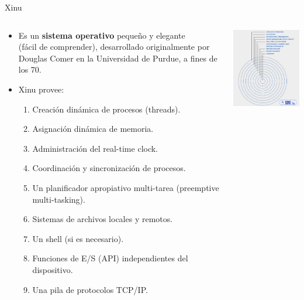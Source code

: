 \documentclass[8pt,aspectratio=169,compress]{beamer}
\begin{document}
\begin{frame}{Xinu}

    \begin{columns}[onlytextwidth,T]
      \column{\dimexpr\linewidth-70mm-5mm}

\begin{small}
	\begin{itemize}
\item[Xinu] Es un \textbf{sistema operativo} pequeño y elegante \\ (fácil de comprender), desarrollado originalmente por Douglas Comer en la Universidad de Purdue, a fines de los 70. 
\bigskip
  \item[Características] Xinu provee:
\begin{enumerate}
\item Creación dinámica de procesos (threads).
\item Asignación dinámica de memoria.
\item Administración del real-time clock.
\item Coordinación y sincronización de procesos.
\item Un planificador apropiativo multi-tarea (preemptive multi-tasking).
\item Sistemas de archivos locales y remotos.
\item Un shell (si es necesario).
\item Funciones de E/S (API) independientes del dispositivo.
\item Una pila de protocolos TCP/IP.
\end{enumerate}
	\end{itemize}

\end{small}


      \column{70mm}
     \includegraphics[width=60mm]{images/xinu.jpg}

    \end{columns}
\end{frame}
\end{document}
